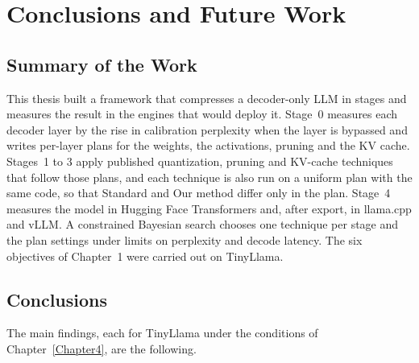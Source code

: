 \chapter{Conclusions and Future Work}
\label{Chapter6}

\section{Summary of the Work}
\label{sec:ch6-summary}

This thesis built a framework that compresses a decoder-only LLM in stages and measures the result in the engines that would deploy it. Stage~0 measures each decoder layer by the rise in calibration perplexity when the layer is bypassed and writes per-layer plans for the weights, the activations, pruning and the KV cache. Stages~1 to 3 apply published quantization, pruning and KV-cache techniques that follow those plans, and each technique is also run on a uniform plan with the same code, so that Standard and Our method differ only in the plan. Stage~4 measures the model in Hugging Face Transformers and, after export, in llama.cpp and vLLM. A constrained Bayesian search chooses one technique per stage and the plan settings under limits on perplexity and decode latency. The six objectives of Chapter~1 were carried out on TinyLlama.

\section{Conclusions}
\label{sec:ch6-conclusions}

The main findings, each for TinyLlama under the conditions of Chapter~\ref{Chapter4}, are the following.

